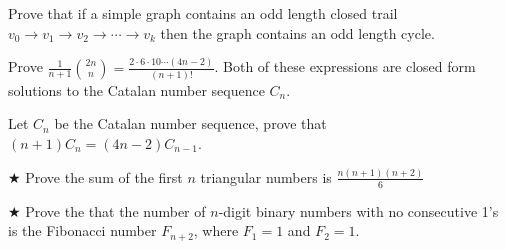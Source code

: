 \begin{proofp}
Prove that if a simple graph contains an odd length closed trail $v_0 \rightarrow v_1 \rightarrow v_2 \rightarrow \cdots \rightarrow v_k$ then the graph contains an odd length cycle.
\end{proofp}




\begin{proofp} \label{cproof}
Prove  $\frac{1}{n+1}\binom{2n}{n}= \frac{2 \cdot 6\cdot 10 \cdots (4n-2)}{(n+1)!}$.  Both of these expressions are closed form solutions to the Catalan number sequence $C_n$.
\end{proofp}

\begin{proofp} \label{cproof}
Let $C_n$ be the Catalan number sequence, prove that $(n+1)C_n=(4n-2)C_{n-1}$.
\end{proofp}





\begin{proofp}$\bigstar$
Prove the sum of the first $n$ triangular numbers is $\frac{n(n+1)(n+2)}{6}$
\end{proofp}

\begin{proofp}$\bigstar$
Prove the that the number of $n$-digit binary numbers with no consecutive 1's is the Fibonacci number $F_{n+2}$, where $F_1=1$ and $F_2=1$.
\end{proofp}

